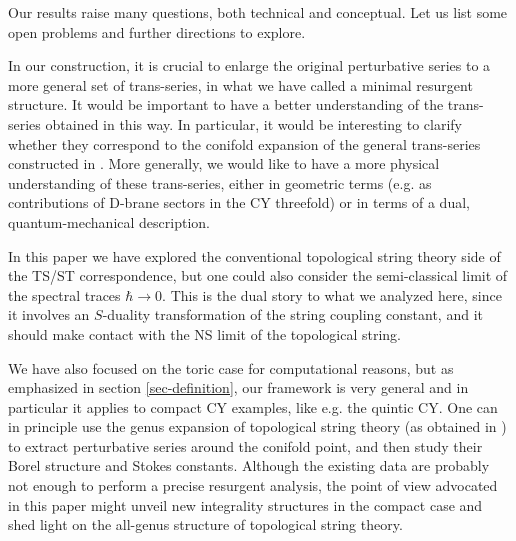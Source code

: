 \documentclass[a4paper,11pt]{article}
\theoremstyle{definition}
\begin{document}
Our results raise many questions, both technical and conceptual. Let us list some open problems and further directions to explore. 

In our construction, it is crucial to enlarge the original perturbative series to a more general 
set of trans-series, in what we have called a minimal resurgent structure. It would be important to 
have a better understanding of the trans-series obtained in this way. In particular, it would be interesting 
to clarify whether they correspond to the conifold expansion of the general trans-series constructed in \cite{cesv1,cesv2}. More generally, we would like to have a more physical understanding of these trans-series, either in geometric terms (e.g. as contributions of D-brane sectors in the CY threefold) or in terms of a dual, quantum-mechanical description. 

In this paper we have explored the conventional topological string theory side of the TS/ST correspondence, but one could also consider the semi-classical limit of the spectral traces $\hbar \rightarrow 0$. This is the dual story to what we analyzed here, since it involves an $S$-duality transformation of the string coupling constant, and it should make contact with the NS limit of the topological string. 

We have also focused on the toric case for computational reasons, but as emphasized in section \ref{sec-definition}, 
our framework is very general and in particular it applies to 
compact CY examples, like e.g. the quintic CY. One can in principle use the genus expansion of topological string theory (as obtained in \cite{hk-quintic}) to extract perturbative series around the conifold point, and then study their Borel structure and Stokes constants. Although the existing data are probably not enough to perform a precise resurgent analysis, the point of view advocated in this paper might unveil 
new integrality structures in the compact case and shed light on the all-genus structure of topological string theory. 

\end{document}
